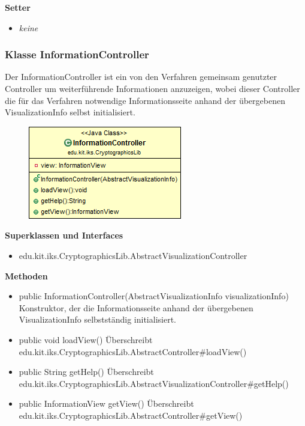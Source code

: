 \documentclass{article}
\begin{document}
      \textbf{Setter}
      \begin{itemize}
        \item \textit{keine}
      \end{itemize}
	
	\subsubsection{Klasse InformationController}
	  Der InformationController ist ein von den Verfahren gemeinsam genutzter
	  Controller um weiterführende Informationen anzuzeigen, wobei dieser Controller
	  die für das Verfahren notwendige Informationsseite anhand der übergebenen VisualizationInfo
	  selbst initialisiert.
	
      \begin{figure}[H]
        \centering
        \includegraphics[width=\textwidth]{resources/edu-kit-iks-CryptographicsLib-InformationController}
      \end{figure}
	
      \textbf{Superklassen und Interfaces}
      \begin{itemize}
        \item edu.kit.iks.CryptographicsLib.AbstractVisualizationController
      \end{itemize}
	
      \textbf{Methoden}
      \begin{itemize}
        \item public InformationController(AbstractVisualizationInfo visualizationInfo) \newline
          Konstruktor, der die Informationsseite anhand der übergebenen VisualizationInfo
          selbstständig initialisiert.
		\item public void loadView() \newline
		  Überschreibt edu.kit.iks.CryptographicsLib.AbstractController\#loadView()
		\item public String getHelp() \newline
		  Überschreibt edu.kit.iks.CryptographicsLib.AbstractVisualizationController\#getHelp()
		\item public InformationView getView() \newline
		  Überschreibt edu.kit.iks.CryptographicsLib.AbstractController\#getView()
      \end{itemize}
      
\end{document}
